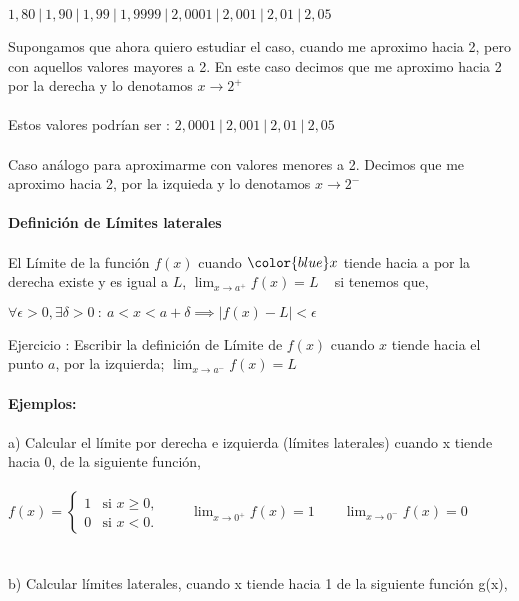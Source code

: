 \documentclass[11pt, a4paper]{article}
\begin{document}
{\begin{center}
    $ 1,80 ~|~ 1,90 ~|~ 1,99 ~|~ 1,9999 ~|~ 2,0001 ~|~ 2,001 ~|~ 2,01 ~|~ 2,05 $    
\end{center}
Supongamos que ahora quiero estudiar el caso, cuando me aproximo hacia 2, pero con aquellos valores mayores a 2. En este caso decimos que me aproximo hacia 2 {\color{blue} por la derecha } y lo denotamos {\color{blue} $x\to 2^+$}\\ \\
Estos valores podr\'ian ser : $ 2,0001 ~|~ 2,001 ~|~ 2,01 ~|~ 2,05 $ \\ \\     
Caso an\'alogo para aproximarme con valores menores a 2. Decimos que me aproximo hacia 2, por {\color{blue} la izquieda} y lo denotamos {\color{blue} $x\to 2^-$} \\ \\
\textbf{Definici\'on de L\'imites laterales} \\ \\ 
El L\'imite de la funci\'on {\color{blue} $f(x)$} cuando $\color{blue} x $ tiende hacia {\color{blue} a} por la derecha existe y es igual a {\color{blue} $L$}, {\color{blue}$ \displaystyle \lim_{x \to a^+} f(x) = L  $} ~ si tenemos que, 
\begin{center}
    {\color{blue} $ \forall \epsilon > 0, \exists \delta >0 ~:~ a < x < a + \delta  \implies | f(x) - L | < \epsilon $}
\end{center}
{\color{magenta} Ejercicio : Escribir la definici\'on de L\'imite de $f(x)$ cuando $x$ tiende hacia el punto $a$, por la izquierda;  $ \displaystyle \lim_{x \to a^-} f(x) = L  $ } \\ \\
{\color{green} \textbf{Ejemplos: } } \\ \\ 
a) Calcular el l\'imite por derecha e izquierda (l\'imites laterales) cuando x tiende hacia 0, de la siguiente funci\'on, \\ \\
$ 
    f(x) = \begin{cases}
              1 & \text{si } x \geq 0,\\
               0 & \text{si } x < 0.
          \end{cases}
  $ ~ ~ $ \displaystyle \lim_{x \to 0^+} f(x) = 1 $ ~ ~ $ \displaystyle \lim_{x \to 0^-} f(x) = 0 $ \\ \\ \\
b) Calcular l\'imites laterales, cuando x tiende hacia 1 de la siguiente funci\'on g(x), \\ \\
}
\end{document}
